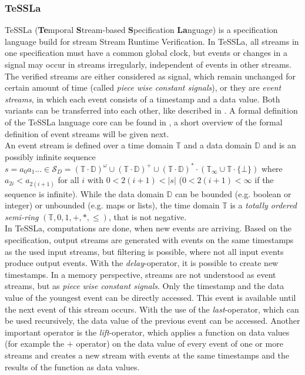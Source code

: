 	\subsubsection{TeSSLa}
		TeSSLa (\textbf{Te}mporal \textbf{S}tream-based \textbf{S}pecification \textbf{La}nguage) \cite{TeSSLa1} is a specification language build for stream Stream Runtime Verification. In TeSSLa, all streams in one specification must have a common global clock, but events or changes in a signal may occur in streams irregularly, independent of events in other streams. The verified streams are either considered as signal, which remain unchanged for certain amount of time (called \textit{piece wise constant signals}), or they are \textit{event streams}, in which each event consists of a timestamp and a data value. Both variants can be transferred into each other, like described in \cite{TeSSLa1}. A formal definition of the TeSSLa language core can be found in \cite{TeSSLa2}, a short overview of the formal definition of event streams will be given next.\\
		An event stream is defined over a time domain $\mathbb{T}$ and a data domain $\mathbb{D}$ and is an possibly infinite sequence $s=a_0a_1...\in\mathcal{S}_D=(\mathbb{T}\cdot\mathbb{D})^\omega\cup(\mathbb{T}\cdot\mathbb{D})^+\cup(\mathbb{T}\cdot\mathbb{D})^*\cdot(\mathbb{T}_\infty\cup\mathbb{T}\cdot\{\bot\})$ where $a_{2i} < a_{2(i+1)}$ for all $i$ with $0 < 2(i + 1) < |s|$ ($0 < 2(i + 1) < \infty$ if the sequence is infinite). While the data domain $\mathbb{D}$ can be bounded (e.g. boolean or integer) or unbounded (e.g. maps or lists), the time domain $\mathbb{T}$ is a \emph{totally ordered semi-ring} $(\mathbb{T}, 0, 1, +, *, \leq)$, that is not negative.\\
		In TeSSLa, computations are done, when new events are arriving. Based on the specification, output streams are generated with events on the same timestamps as the used input streams, but filtering is possible, where not all input events produce output events. With the \emph{delay}-operator, it is possible to create new timestamps. In a memory perspective, streams are not understood as event streams, but as \textit{piece wise constant signals}. Only the timestamp and the data value of the youngest event can be directly accessed. This event is available until the next event of this stream occurs. With the use of the \textit{last}-operator, which can be used recursively, the data value of the previous event can be accessed. Another important operator is the \textit{lift}-operator, which applies a function on data values (for example the $+$ operator) on the data value of every event of one or more streams and creates a new stream with events at the same timestamps and the results of the function as data values.
		
